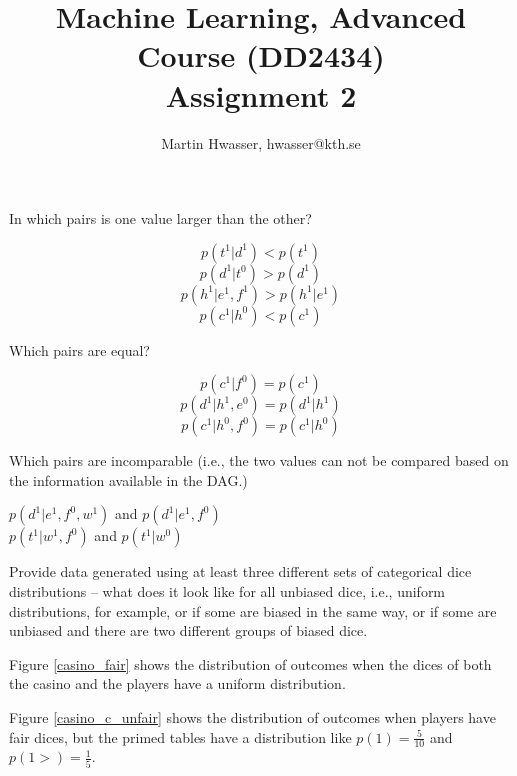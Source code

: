 \documentclass[12pt]{article}
\newenvironment{question}[2][Question]{\kern10pt \begin{trivlist}
\begin{tcolorbox}
\item[\hskip \labelsep {\bfseries #1}\hskip \labelsep {\bfseries #2.}]}
{\end{tcolorbox} \end{trivlist}}
\begin{document}
 
\graphicspath{ {img/} }
 
\renewcommand{\qedsymbol}{\filledbox}
 
\title{Machine Learning, Advanced Course (DD2434)\\
		Assignment 2}
\author{Martin Hwasser, hwasser@kth.se}
 
\maketitle

\begin{question}{1}

In which pairs is one value larger than the other?
\end{question}
$$p(t^1 \vert d^1) < p(t^1)$$
$$p(d^1 \vert t^0) > p(d^1)$$
$$p(h^1 \vert e^1, f^1) > p(h^1 \vert e^1)$$
$$p(c^1 \vert h^0) < p(c^1)$$

\begin{question}{2}
Which pairs are equal?
\end{question}
$$p(c^1 \vert f^0) = p(c^1)$$
$$p(d^1 \vert h^1, e^0) = p(d^1 \vert h^1)$$
$$p(c^1 \vert h^0, f^0) = p(c^1 \vert h^0)$$

\begin{question}{3}
Which pairs are incomparable (i.e., the two values can not be compared based on the information available in the DAG.)
\end{question}
\begin{center}
$p(d^1 \vert e^1, f^0, w^1)$ and $p(d^1 \vert e^1, f^0)$
\\
$p(t^1 \vert w^1, f^0)$ and $p(t^1 \vert w^0)$
\end{center}

\begin{question}{6}
Provide data generated using at least three different sets of categorical dice distributions – what does it look like for all unbiased dice, i.e., uniform distributions, for example, or if some are biased in the same way, or if some are unbiased and there are two different groups of biased dice.
\end{question}

Figure \ref{casino_fair} shows the distribution of outcomes when the dices of both the casino and the players have a uniform distribution.

Figure \ref{casino_c_unfair} shows the distribution of outcomes when players have fair dices, but the primed tables have a distribution like $p(1) = \frac{5}{10}$ and $p(1>) = \frac{1}{5}$.
\end{document}
